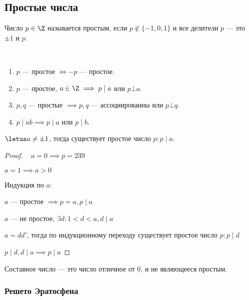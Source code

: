 \subsection{Простые числа}

\begin{defn}
    Число $p \in \Z$ называется простым, если $p \notin \{-1, 0, 1\}$ и все делители $p$ --- это $\pm 1$ и $p$.
\end{defn}

\begin{prop}~
    \begin{enumerate}
        \item $p$ --- простое $\iff -p$ --- простое.
        
        \item $p$ --- простое, $a \in \Z \implies p \mid a$ или $p \bot a$.
        
        \item $p, q$ --- простые $\implies p, q$ --- ассоциированны или $p \bot q$.
        
        \item $p \mid ab \implies p \mid a$ или $p \mid b$. 
    \end{enumerate}
\end{prop}

\begin{theorem-non}
    $\letus a \neq \pm 1$, тогда существует простое число $p : p \mid a$.
\end{theorem-non}

\begin{proof}~
    $a = 0 \implies p = 239$
    
    $a = 1 \implies a > 0$
    
    Индукция по $a$:
    
    $a$ --- простое $\implies p = a, p \mid a$
    
    $a$ --- не простое, $\exists d : 1 < d < a, d \mid a$
    
    $a = dd'$, тогда по индукционному переходу существует простое число $p : p \mid d$
    
    $p \mid d, d \mid a \implies p \mid a$
\end{proof}

\begin{defn}
    Составное число --- это число отличное от 0, и не являющееся простым.
\end{defn}

\subsubsection*{Решето Эратосфена}

